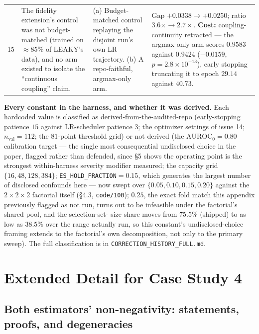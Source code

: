 \documentclass[10pt]{article} %
\begin{document}
\begin{longtable}{@{}p{}p{}p{}p{}@{}}
15 & The fidelity extension's control was not budget-matched (trained on $\approx85\%$ of LEAKY's data), and no arm existed to isolate the ``continuous coupling'' claim. & (a) Budget-matched control replaying the disjoint run's own LR trajectory. (b) A repo-faithful, argmax-only arm. & Gap $+0.0338\to\mathbf{+0.0250}$; ratio $3.6\times\to2.7\times$. \textbf{Cost:} coupling-continuity retracted --- the argmax-only arm scores $0.9583$ against $0.9424$ ($-0.0159$, $p=2.8\times10^{-13}$), early stopping truncating it to epoch $29.14$ against $40.73$. \\

\end{longtable}
\normalsize

\medskip\noindent\textbf{Every constant in the harness, and whether it was
derived.} Each hardcoded value is classified as derived-from-the-audited-repo
(early-stopping patience $15$ against LR-scheduler patience $3$; the optimizer
settings of issue 14; $n_{\text{val}}=112$; the $81$-point threshold grid) or
not derived (the $\text{AUROC}_0=0.80$ calibration target --- the single most
consequential undisclosed choice in the paper, flagged rather than defended,
since §5 shows the operating point is the strongest within-harness severity
modifier measured; the capacity grid $\{16,48,128,384\}$;
\texttt{ES\_HOLD\_FRACTION}$=0.15$, which generates the largest number of
disclosed confounds here --- now swept over $\{0.05,0.10,0.15,0.20\}$ against
the $2\times2\times2$ factorial itself (§4.3, \texttt{code/100});
$0.25$, the exact fold match this appendix previously flagged as not run, turns
out to be infeasible under the factorial's shared pool, and the selection-set-
size share moves from $75.5\%$ (shipped) to as low as $38.5\%$ over the range
actually run, so this constant's undisclosed-choice framing extends to the
factorial's own decomposition, not only to the primary sweep). The full
classification is in
\texttt{CORRECTION\_HISTORY\_FULL.md}.

\section{Extended Detail for Case Study 4}

\subsection{Both estimators' non-negativity: statements, proofs, and degeneracies}
\label{sec:cs4-degeneracy}
\end{document}
